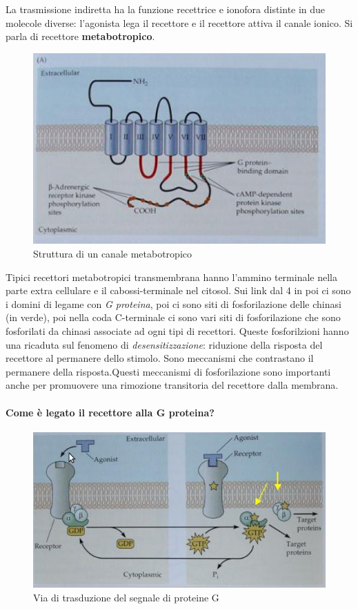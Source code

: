 \documentclass[a4paper,12pt]{article}
\begin{document}
La trasmissione indiretta ha la funzione recettrice e ionofora distinte in due molecole diverse: l'agonista lega il recettore e il recettore attiva il canale ionico. Si parla di recettore \textbf{metabotropico}.
\begin{figure}[H]
\centering
\includegraphics[scale=0.45]{immagine/metabotropico.jpg}
\caption{Struttura di un canale metabotropico}
\end{figure} 

Tipici recettori metabotropici transmembrana hanno l'ammino terminale nella parte extra cellulare e il cabossi-terminale nel citosol.  Sui link dal 4 in poi ci sono i domini di legame con \emph{G proteina}, poi ci sono siti di fosforilazione delle chinasi (in verde), poi nella coda C-terminale ci sono vari siti di fosforilazione che sono fosforilati da chinasi associate ad ogni tipi di recettori. Queste fosforilzioni hanno una ricaduta sul fenomeno di \emph{desensitizzazione}: riduzione della risposta del recettore al permanere dello stimolo.  Sono meccanismi che contrastano il permanere della risposta.Questi meccanismi di fosforilazione sono importanti  anche per promuovere una rimozione transitoria del recettore dalla membrana.

\paragraph{Come è legato il recettore alla G proteina?}
\begin{figure}[H]
\centering
\includegraphics[scale=0.45]{immagine/G.jpg}
\caption{Via di trasduzione del segnale di proteine G}
\end{figure} 
\end{document}
